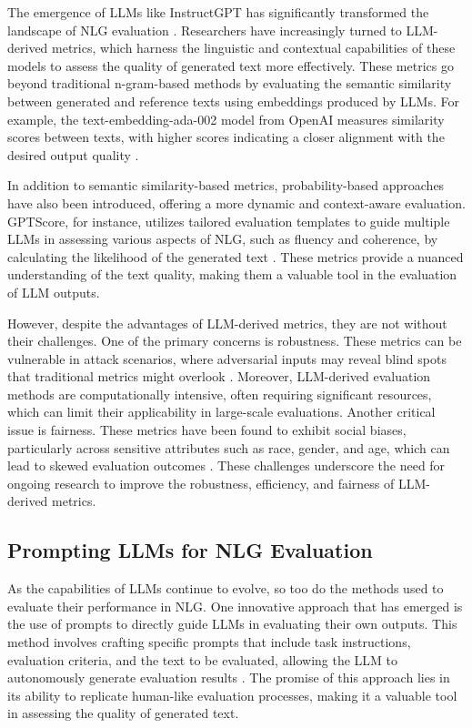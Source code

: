 The emergence of LLMs like InstructGPT has significantly transformed the landscape of NLG evaluation \cite{ouyang2022training}. Researchers have increasingly turned to LLM-derived metrics, which harness the linguistic and contextual capabilities of these models to assess the quality of generated text more effectively. These metrics go beyond traditional n-gram-based methods by evaluating the semantic similarity between generated and reference texts using embeddings produced by LLMs. For example, the text-embedding-ada-002 model from OpenAI measures similarity scores between texts, with higher scores indicating a closer alignment with the desired output quality \cite{es2023ragas}.

In addition to semantic similarity-based metrics, probability-based approaches have also been introduced, offering a more dynamic and context-aware evaluation. GPTScore, for instance, utilizes tailored evaluation templates to guide multiple LLMs in assessing various aspects of NLG, such as fluency and coherence, by calculating the likelihood of the generated text \cite{fu2023gptscore}. These metrics provide a nuanced understanding of the text quality, making them a valuable tool in the evaluation of LLM outputs.

However, despite the advantages of LLM-derived metrics, they are not without their challenges. One of the primary concerns is robustness. These metrics can be vulnerable in attack scenarios, where adversarial inputs may reveal blind spots that traditional metrics might overlook \cite{he2022blind}. Moreover, LLM-derived evaluation methods are computationally intensive, often requiring significant resources, which can limit their applicability in large-scale evaluations. Another critical issue is fairness. These metrics have been found to exhibit social biases, particularly across sensitive attributes such as race, gender, and age, which can lead to skewed evaluation outcomes \cite{sun2022bertscore}. These challenges underscore the need for ongoing research to improve the robustness, efficiency, and fairness of LLM-derived metrics.

\subsection{Prompting LLMs for NLG Evaluation}

As the capabilities of LLMs continue to evolve, so too do the methods used to evaluate their performance in NLG. One innovative approach that has emerged is the use of prompts to directly guide LLMs in evaluating their own outputs. This method involves crafting specific prompts that include task instructions, evaluation criteria, and the text to be evaluated, allowing the LLM to autonomously generate evaluation results \cite{gao2024llm}. The promise of this approach lies in its ability to replicate human-like evaluation processes, making it a valuable tool in assessing the quality of generated text.

